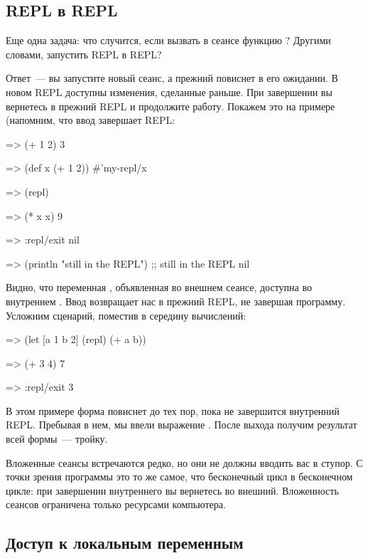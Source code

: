\subsection{REPL в REPL}

Еще одна задача: что случится, если вызвать в сеансе функцию ? Другими словами, запустить REPL в REPL?

Ответ~--- вы запустите новый сеанс, а прежний повиснет в его ожидании. В новом REPL доступны изменения, сделанные раньше. При завершении вы вернетесь в прежний REPL и продолжите работу. Покажем это на примере (напомним, что ввод  завершает REPL:

\begin{english}
  \begin{clojure/lines}
=> (+ 1 2)
3

=> (def x (+ 1 2))
#'my-repl/x

=> (repl)

=> (* x x)
9

=> :repl/exit
nil

=> (println "still in the REPL")
;; still in the REPL
nil
  \end{clojure/lines}
\end{english}

Видно, что переменная , объявленная во внешнем сеансе, доступна во внутреннем . Ввод  возвращает нас в прежний REPL, не завершая программу. Усложним сценарий, поместив  в середину вычислений:

\begin{english}
  \begin{clojure/lines}
=> (let [a 1 b 2] (repl) (+ a b))

=> (+ 3 4)
7

=> :repl/exit
3
  \end{clojure/lines}
\end{english}

В этом примере форма  повиснет до тех пор, пока не завершится внутренний REPL. Пребывая в нем, мы ввели выражение  . После выхода получим результат всей формы~--- тройку.

Вложенные сеансы встречаются редко, но они не должны вводить вас в ступор. С точки зрения программы это то же самое, что бесконечный цикл в бесконечном цикле: при завершении внутреннего вы вернетесь во внешний. Вложенность сеансов ограничена только ресурсами компьютера.

\subsection{Доступ к локальным переменным}

